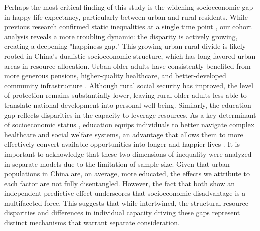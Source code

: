 \documentclass[12pt, a4paper]{article}
\begin{document}
Perhaps the most critical finding of this study is the widening socioeconomic gap in happy life expectancy, particularly between urban and rural residents. While previous research confirmed static inequalities at a single time point \autocite{wan.2024.socioeconomic}, our cohort analysis reveals a more troubling dynamic: the disparity is actively growing, creating a deepening "happiness gap." This growing urban-rural divide is likely rooted in China's dualistic socioeconomic structure, which has long favored urban areas in resource allocation. Urban older adults have consistently benefited from more generous pensions, higher-quality healthcare, and better-developed community infrastructure \autocite{liu.2019.are}. Although rural social security has improved, the level of protection remains substantially lower, leaving rural older adults less able to translate national development into personal well-being. Similarly, the education gap reflects disparities in the capacity to leverage resources. As a key determinant of socioeconomic status \autocite{payne.2022.expansion,shen.2023.disability}, education equips individuals to better navigate complex healthcare and social welfare systems, an advantage that allows them to more effectively convert available opportunities into longer and happier lives \autocite{wan.2024.socioeconomic}. It is important to acknowledge that these two dimensions of inequality were analyzed in separate models due to the limitation of sample size. Given that urban populations in China are, on average, more educated, the effects we attribute to each factor are not fully disentangled. However, the fact that both show an independent predictive effect underscores that socioeconomic disadvantage is a multifaceted force. This suggests that while intertwined, the structural resource disparities and differences in individual capacity driving these gaps represent distinct mechanisms that warrant separate consideration.
\end{document}
